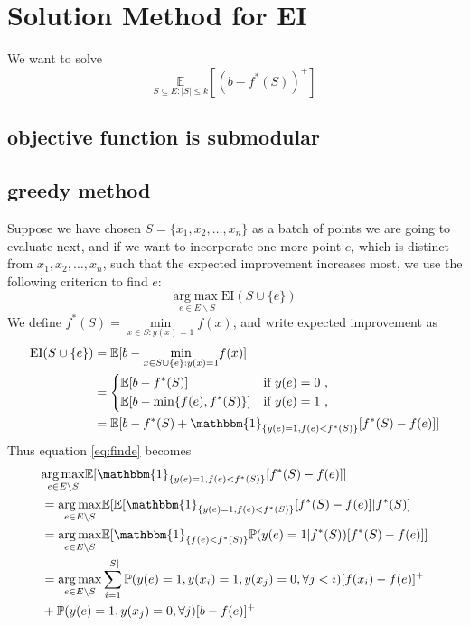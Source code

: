 \documentclass[12pt]{article}
\newcommand{\E}{\mathbb{E}}
\newcommand{\EI}{\mathrm{EI}}
\begin{document}
\section{Solution Method for EI}
We want to solve 
\begin{equation*}
\underset{S \subseteq E:|S| \leq k}{\E} \left[ (b-f^*(S))^+ \right]
\end{equation*}
\subsection{objective function is submodular}
\subsection{greedy method}
Suppose we have chosen $S=\{x_1, x_2, \ldots, x_n\}$ as a batch of points we are going to evaluate next, and if we want to incorporate one more point $e$, which is distinct from $x_1, x_2, \ldots, x_n$, such that the expected improvement increases most, we use the following criterion to find $e$:
\begin{equation} \label{eq:finde}
\underset{e \in E \backslash S}{\mathrm{arg}\max} \EI (S \cup \{e\})
\end{equation}
We define $f^*(S)=\underset{x \in S:y(x)=1}{\min} f(x)$, and write expected improvement as
\begin{align*}
\EI (S \cup \{e\}) &= \E [b-\underset{x \in S \cup \{e\}:y(x)=1}{\min} f(x)] \\
                  &= 
                  \begin{dcases}
                    \E [b- f^*(S)] & \text{if $y(e)=0$ ,} \\
                    \E [b- \min \{f(e), f^*(S)\}]       & \text{if $y(e)=1$ ,}
                    \end{dcases} \\
                  &= \E [b-f^*(S) + \mathbbm{1}_{\{y(e)=1, f(e) < f^*(S)\}} [f^*(S)-f(e)] ]
\end{align*}
Thus equation \eqref{eq:finde} becomes
\begin{align*}
&\underset{e \in E \backslash S}{\mathrm{arg}\max} \E [ \mathbbm{1}_{\{y(e)=1, f(e) < f^*(S)\}} [f^*(S)-f(e)] ] \\
&=\underset{e \in E \backslash S}{\mathrm{arg}\max} \E [ \E [\mathbbm{1}_{\{y(e)=1, f(e) < f^*(S)\}} [f^*(S)-f(e)] | f^*(S)]\\
&= \underset{e \in E \backslash S}{\mathrm{arg}\max} \E [ \mathbbm{1}_{\{f(e)<f^*(S)\}} \mathbb{P} (y(e)=1 | f^*(S)) [f^*(S)-f(e)]] \\
&= \underset{e \in E \backslash S}{\mathrm{arg}\max} \sum_{i=1}^{|S|} \mathbb{P} (y(e)=1, y(x_i)=1, y(x_j)=0, \forall j <i) [f(x_i)-f(e)]^+ \\
&+ \mathbb{P} (y(e)=1, y(x_j)=0, \forall j) [b-f(e)]^+
\end{align*}
\end{document}

